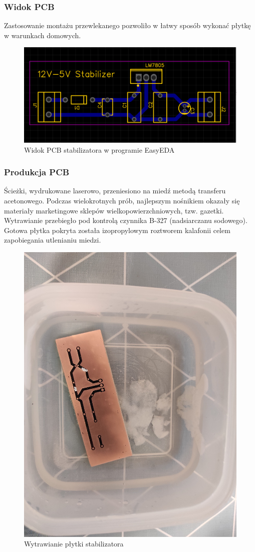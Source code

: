 \documentclass[10pt,a4paper]{scrartcl}
\begin{document}
		\subsubsection{Widok PCB}
		Zastosowanie montażu przewlekanego pozwoliło w łatwy sposób wykonać płytkę w warunkach domowych.
		\begin{figure}[H]
			\centering
			\includegraphics[width=0.7\linewidth]{stabilizator_PCB}
			\caption{Widok PCB stabilizatora w programie EasyEDA}
			\label{fig:stabilizatorpcb}
		\end{figure}
		\subsubsection{Produkcja PCB}
		Ścieżki, wydrukowane laserowo, przeniesiono na miedź metodą transferu acetonowego. Podczas wielokrotnych prób, najlepszym nośnikiem okazały się materiały marketingowe sklepów wielkopowierzchniowych, tzw. gazetki. Wytrawianie przebiegło pod kontrolą czynnika B-327 (nadsiarczanu sodowego). Gotowa płytka pokryta została izopropylowym roztworem kalafonii celem zapobiegania utlenianiu miedzi.
		\begin{figure}
			\centering
			\includegraphics[width=0.7\linewidth]{wytrawianie}
			\caption[Wytrawianie stabilizatora]{Wytrawianie płytki stabilizatora}
			\label{fig:wytrawianie}
		\end{figure}
	
\end{document}
